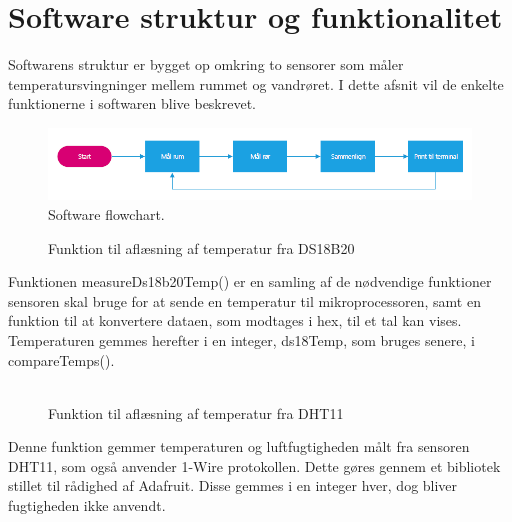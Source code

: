 \section{Software struktur og funktionalitet}
Softwarens struktur er bygget op omkring to sensorer som måler temperatursvingninger mellem rummet og vandrøret. I dette afsnit vil de enkelte funktionerne i softwaren blive beskrevet. 
\begin{figure}[h!]
  \centering
  \includegraphics[width=1\textwidth]{figures/Fase1software.png}
  \caption{Software flowchart.}
  \label{fase1flow}
\end{figure}

\begin{figure}[h!]
  \centering
  \caption{Funktion til aflæsning af temperatur fra DS18B20}
  \label{ds18b20Measure}
\end{figure}
Funktionen measureDs18b20Temp() er en samling af de nødvendige funktioner sensoren skal bruge for at sende en temperatur til mikroprocessoren, samt en funktion til at konvertere dataen, som modtages i hex, til et tal kan vises.\newline
Temperaturen gemmes herefter i en integer, ds18Temp, som bruges senere, i compareTemps().\\\\

\begin{figure}[h!]
  \centering
  \caption{Funktion til aflæsning af temperatur fra DHT11}
  \label{dht11Measure}
\end{figure}
Denne funktion gemmer temperaturen og luftfugtigheden målt fra sensoren DHT11, som også anvender 1-Wire protokollen. Dette gøres gennem et bibliotek stillet til rådighed af Adafruit.\newline
Disse gemmes i en integer hver, dog bliver fugtigheden ikke anvendt.

